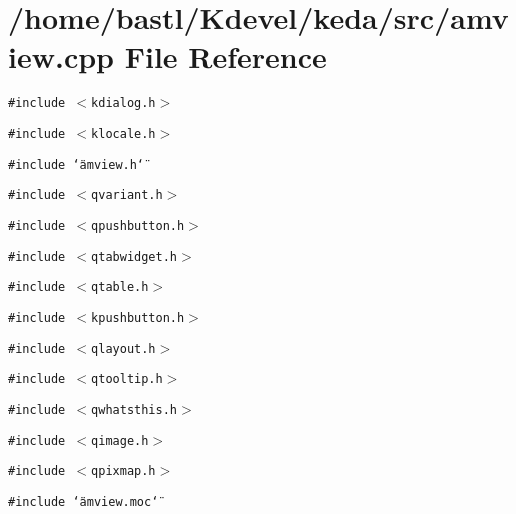 \section{/home/bastl/Kdevel/keda/src/amview.cpp File Reference}
\label{amview_8cpp}
{\tt \#include $<$kdialog.h$>$}\par
{\tt \#include $<$klocale.h$>$}\par
{\tt \#include \char`\"{}amview.h\char`\"{}}\par
{\tt \#include $<$qvariant.h$>$}\par
{\tt \#include $<$qpushbutton.h$>$}\par
{\tt \#include $<$qtabwidget.h$>$}\par
{\tt \#include $<$qtable.h$>$}\par
{\tt \#include $<$kpushbutton.h$>$}\par
{\tt \#include $<$qlayout.h$>$}\par
{\tt \#include $<$qtooltip.h$>$}\par
{\tt \#include $<$qwhatsthis.h$>$}\par
{\tt \#include $<$qimage.h$>$}\par
{\tt \#include $<$qpixmap.h$>$}\par
{\tt \#include \char`\"{}amview.moc\char`\"{}}\par
